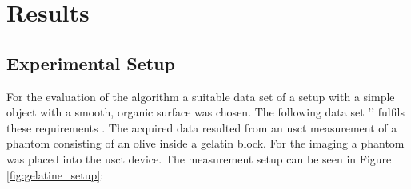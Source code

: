 \chapter{Results}
\label{chap:results}




\section{Experimental Setup}
\label{sec:input_data}


For the evaluation of the algorithm a suitable data set of a setup with a simple object with a smooth, organic surface was chosen. The following data set '' fulfils these requirements \cite{Wittenbeck2017Konzeption3D-Ultraschalltomographie}. The acquired data resulted from an \ac{usct} measurement of a phantom consisting of an olive inside a gelatin block. For the imaging a phantom was placed into the \ac{usct} device. 
The measurement setup can be seen in Figure \ref{fig:gelatine_setup}:


